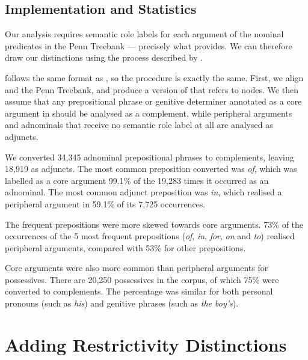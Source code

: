\documentclass[11pt]{article}
\begin{document}
\subsection{Implementation and Statistics}

Our analysis requires semantic role labels for each argument of the
nominal predicates in the Penn Treebank --- precisely what \nombank
\citep{nombank} provides. We can therefore draw our
distinctions using the process described by \citet{honnibal:pacling07prop}.

\nombank follows the same format as \propbank, so the procedure is exactly the
same. First, we align \ccgbank and the Penn Treebank, and produce a version of
\nombank that refers to \ccgbank nodes. We then assume that any prepositional
phrase or genitive determiner annotated as a core argument in \nombank should
be analysed as a complement, while peripheral arguments and adnominals that receive
no semantic role label at all are analysed as adjuncts.

We converted 34,345 adnominal prepositional phrases to complements, leaving 18,919
as adjuncts. The most common preposition converted was \emph{of}, which was
labelled as a core argument 99.1\% of the 19,283 times it occurred as an adnominal.
The most common adjunct preposition was \emph{in}, which realised a peripheral
argument in 59.1\% of its 7,725 occurrences.

The frequent prepositions were more skewed towards core arguments. 73\% of
the occurrences of the 5 most frequent prepositions (\emph{of}, \emph{in},
\emph{for}, \emph{on} and \emph{to}) realised peripheral arguments, compared
with 53\% for other prepositions.

Core arguments were also more common than peripheral arguments for possessives.
There are 20,250 possessives in the corpus, of which 75\%
were converted to complements. The percentage was similar for both personal
pronouns (such as \emph{his}) and genitive phrases (such as
\emph{the boy's}).


\section{Adding Restrictivity Distinctions}
\label{sec:restrictivity}
\end{document}

